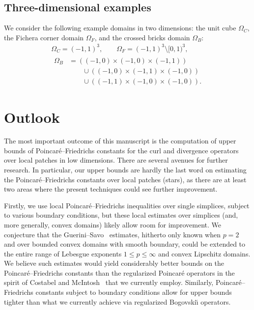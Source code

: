 \documentclass[10pt,a4paper]{article}
\begin{document}
\subsection{Three-dimensional examples}

We consider the following example domains in two dimensions:
the unit cube $\Omega_C$, the Fichera corner domain $\Omega_F$, and the crossed bricks domain $\Omega_{B}$:
\begin{gather*}
    \Omega_{C}  = (-1,1)^3,
    \qquad 
    \Omega_{F}  = (-1,1)^3 \setminus [0,1)^3,
    \\
    \begin{aligned}
    \Omega_{B} &= 
    \left( (-1,0) \times (-1,0) \times (-1,1) \right)
    \\&\qquad
    \cup 
    \left( (-1,0) \times (-1,1) \times (-1,0) \right)
    \\&\qquad
    \cup 
    \left( (-1,1) \times (-1,0) \times (-1,0) \right)
    .
    \end{aligned}
\end{gather*}





\section{Outlook}\label{section:outlook}

The most important outcome of this manuscript is the computation of upper bounds of Poincar\'e--Friedrichs constants for the curl and divergence operators over local patches in low dimensions. 
There are several avenues for further research. 
In particular, our upper bounds are hardly the last word on estimating the Poincar\'e--Friedrichs constants over local patches (stars), 
as there are at least two areas where the present techniques could see further improvement. 


Firstly, we use local Poincar\'e--Friedrichs inequalities over single simplices, subject to various boundary conditions, but these local estimates over simplices (and, more generally, convex domains) likely allow room for improvement. We conjecture that the Guerini--Savo~\cite{guerini2004eigenvalue} estimates, hitherto only known when $p=2$ and over bounded convex domains with smooth boundary, could be extended to the entire range of Lebesgue exponents $1 \leq p \leq \infty$ and convex Lipschitz domains. 
We believe such estimates would yield considerably better bounds on the Poincar\'e--Friedrichs constants than the regularized Poincar\'e operators in the spirit of Costabel and McIntosh~\cite{costabel2010bogovskiui} that we currently employ. Similarly, Poincar\'e--Friedrichs constants subject to boundary conditions allow for upper bounds tighter than what we currently achieve via regularized Bogovski\u{\i} operators. 
\end{document}
